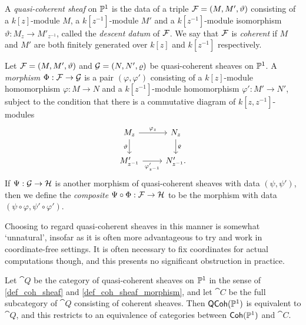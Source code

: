 \begin{definition}
  \label{def_coh_sheaf}
  A \emph{quasi-coherent sheaf} on $\mathbb{P}^{{1}}$ is the data of a triple
  $\mathcal{F} = (M, M', \vartheta)$ consisting of a $k[z]$-module $M$, a
  $k[z^{-1}]$-module $M'$ and a $k[z^{-1}]$-module isomorphism
  $\vartheta: M_{z} \to M'_{z^{-1}}$, called the \emph{descent datum}
  of $\mathcal{F}$.
  We say that $\mathcal{F}$ is \emph{coherent} if $M$ and $M'$ are both
  finitely generated over $k[z]$ and $k[z^{-1}]$ respectively.
\end{definition}

\begin{definition}
  \label{def_coh_sheaf_morphism}
  Let $\mathcal{F} = (M, M', \vartheta)$ and $\mathcal{G} = (N, N', \varrho)$
  be quasi-coherent sheaves on $\mathbb{P}^{{1}}$.
  A \emph{morphism} $\Phi: \mathcal{F} \to \mathcal{G}$ is a pair $(\varphi,
  \varphi')$ consisting of a $k[z]$-module homomorphism $\varphi: M
  \to N$ and a $k[z^{-1}]$-module homomorphism $\varphi': M' \to N'$,
  subject to the condition that there is a commutative diagram of
  $k[z, z^{-1}]$-modules
  \[
    \begin{tikzcd}
      {M_z} & {N_z} \\
      {M'_{z^{-1}}} & {N'_{z^{-1}}}.
      \arrow["{\varphi_z}", from=1-1, to=1-2]
      \arrow["\vartheta"', from=1-1, to=2-1]
      \arrow["\varrho", from=1-2, to=2-2]
      \arrow["{\varphi'_{z^{-1}}}"', from=2-1, to=2-2]
    \end{tikzcd}
  \]
  If $\Psi: \mathcal{G} \to \mathcal{H}$ is another morphism of
  quasi-coherent sheaves with data $(\psi, \psi')$, then we define
  the \emph{composite} $\Psi \circ \Phi: \mathcal{F} \to \mathcal{H}$ to be
  the morphism with data $(\psi \circ \varphi, \psi' \circ \varphi')$.
\end{definition}

Choosing to regard quasi-coherent sheaves in this manner is somewhat
`unnatural', insofar as it is often more advantageous to try and work
in coordinate-free settings.
It is often necessary to fix coordinates for actual computations
though, and this presents no significant obstruction in practice.

\begin{proposition}
  Let $\cat{Q}$ be the category of quasi-coherent sheaves on
  $\mathbb{P}^{{1}}$ in the sense of \cref{def_coh_sheaf} and
  \cref{def_coh_sheaf_morphism}, and let $\cat{C}$ be the full
  subcategory of $\cat{Q}$ consisting of coherent sheaves.
  Then $\operatorname{\mathsf{QCoh}}(\mathbb{P}^{{1}})$ is equivalent to $\cat{Q}$, and this
  restricts to an equivalence of categories between $\operatorname{\mathsf{Coh}}(\mathbb{P}^{{1}})$
  and $\cat{C}$.
\end{proposition}


